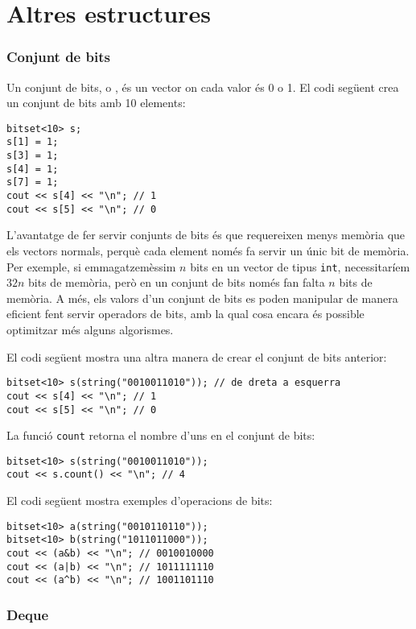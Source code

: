\section{Altres estructures}

\subsubsection{Conjunt de bits}


Un conjunt de bits, o , és un vector
on cada valor és 0 o 1.
El codi següent crea un conjunt de bits amb 10 elements:
\begin{lstlisting}
bitset<10> s;
s[1] = 1;
s[3] = 1;
s[4] = 1;
s[7] = 1;
cout << s[4] << "\n"; // 1
cout << s[5] << "\n"; // 0
\end{lstlisting}

L'avantatge de fer servir conjunts de bits és
que requereixen menys memòria que els vectors normals,
perquè cada element només fa servir un únic bit de memòria.
Per exemple,
si emmagatzemèssim $n$ bits en un vector de tipus \texttt{int},
necessitaríem $32n$ bits de memòria,
però en un conjunt de bits només fan falta $n$ bits de memòria.
A més, els valors d'un conjunt de bits
es poden manipular de manera eficient fent servir
operadors de bits, amb la qual cosa encara és possible
optimitzar més alguns algorismes.

El codi següent mostra una altra manera de crear el conjunt de bits
anterior:
\begin{lstlisting}
bitset<10> s(string("0010011010")); // de dreta a esquerra
cout << s[4] << "\n"; // 1
cout << s[5] << "\n"; // 0
\end{lstlisting}

La funció \texttt{count} retorna el nombre
d'uns en el conjunt de bits:

\begin{lstlisting}
bitset<10> s(string("0010011010"));
cout << s.count() << "\n"; // 4
\end{lstlisting}

El codi següent mostra exemples d'operacions de bits:
\begin{lstlisting}
bitset<10> a(string("0010110110"));
bitset<10> b(string("1011011000"));
cout << (a&b) << "\n"; // 0010010000
cout << (a|b) << "\n"; // 1011111110
cout << (a^b) << "\n"; // 1001101110
\end{lstlisting}

\subsubsection{Deque}

